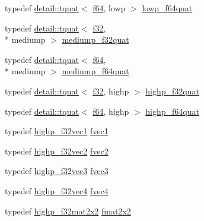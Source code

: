\begin{DoxyCompactItemize}
typedef \hyperlink{structglm_1_1detail_1_1tquat}{detail\-::tquat}$<$ \hyperlink{group__gtc__type__precision_ga2bba392e555124b36cde6abba349bab3}{f64}, lowp $>$ \hyperlink{group__gtc__type__precision_ga225e6f95dd6a7049b1a86db23b90cbac}{lowp\-\_\-f64quat}
\item 
typedef \hyperlink{structglm_1_1detail_1_1tquat}{detail\-::tquat}$<$ \hyperlink{group__gtc__type__precision_ga0ec999b57f5330d9021256e96038df04}{f32}, \\*
mediump $>$ \hyperlink{group__gtc__type__precision_gab038e3482ca401bca2b2634c96f44f09}{mediump\-\_\-f32quat}
\item 
typedef \hyperlink{structglm_1_1detail_1_1tquat}{detail\-::tquat}$<$ \hyperlink{group__gtc__type__precision_ga2bba392e555124b36cde6abba349bab3}{f64}, \\*
mediump $>$ \hyperlink{group__gtc__type__precision_ga7cf626acf7f4fc29355c147bfe05163d}{mediump\-\_\-f64quat}
\item 
typedef \hyperlink{structglm_1_1detail_1_1tquat}{detail\-::tquat}$<$ \hyperlink{group__gtc__type__precision_ga0ec999b57f5330d9021256e96038df04}{f32}, highp $>$ \hyperlink{group__gtc__type__precision_ga26eef27d2efbd759e7e93c40672402e9}{highp\-\_\-f32quat}
\item 
typedef \hyperlink{structglm_1_1detail_1_1tquat}{detail\-::tquat}$<$ \hyperlink{group__gtc__type__precision_ga2bba392e555124b36cde6abba349bab3}{f64}, highp $>$ \hyperlink{group__gtc__type__precision_ga9372e8b60f401fd94aba637b3ed17cfc}{highp\-\_\-f64quat}
\item 
typedef \hyperlink{group__gtc__type__precision_gac8be8ce31b9df0a5005d7c7458a3d03e}{highp\-\_\-f32vec1} \hyperlink{group__gtc__type__precision_gab927d62f22fa57461367011950cec650}{fvec1}
\item 
typedef \hyperlink{group__gtc__type__precision_gabba3e1b3ae0bcaa7aaac573c08c2f8d3}{highp\-\_\-f32vec2} \hyperlink{group__gtc__type__precision_gaafd518792a4646c7bb60aabc62a4684c}{fvec2}
\item 
typedef \hyperlink{group__gtc__type__precision_ga581a4a4eb1f3a269d16af0c4e2d8daf4}{highp\-\_\-f32vec3} \hyperlink{group__gtc__type__precision_ga33b85a14a8f68ec99029ff13db6af369}{fvec3}
\item 
typedef \hyperlink{group__gtc__type__precision_ga53d3c1a17e2e6f26ee5ad1e8879d710e}{highp\-\_\-f32vec4} \hyperlink{group__gtc__type__precision_ga55d1365630d3b3ecf7c7f4e7c29a9cb1}{fvec4}
\item 
typedef \hyperlink{group__gtc__type__precision_gaf3a2cc948ca6fd168391138ce6fdd100}{highp\-\_\-f32mat2x2} \hyperlink{group__gtc__type__precision_gada7823c23ae249dccaecb5a016c667f4}{fmat2x2}

\end{DoxyCompactItemize}
